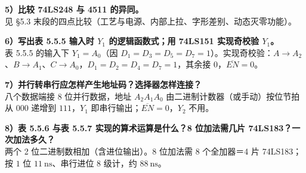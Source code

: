 \documentclass[11pt]{ctexart}
\let\orighdr\hdr
\renewcommand{\hdr}[2]{\needspace{10\baselineskip}\orighdr{#1}{#2}}
\begin{document}
\textbf{5）比较 74LS248 与 4511 的异同。}\\
见 §5.3 末段的四点比较（工艺与电源、内部上拉、字形差别、动态灭零功能）。

\textbf{6）写出表 5.5.5 输入时 $Y_1$ 的逻辑函数式；用 74LS151 实现奇校验 $Y_1$。}\\
表 5.5.5 的输入下 $Y_1=A_0$（因 $D_1=D_3=D_5=D_7=1$）。实现奇校验：$A\to A_2$、$B\to A_1$、$C\to A_0$，$D_1=D_2=D_4=D_7=1$，其余接 0，$\overline{EN}=0$。

\textbf{7）并行转串行应怎样产生地址码？选择器怎样连接？}\\
八个数据端接 8 位并行数据，地址 $A_2A_1A_0$ 由二进制计数器（或手动）按位节拍从 $000$ 递增到 $111$，$Y_1$ 即串行输出；$\overline{EN}=0$，$Y_2$ 不用。

\textbf{8）表 5.5.6 与表 5.5.7 实现的算术运算是什么？8 位加法需几片 74LS183？一次加法多久？}\\
两个 2 位二进制数相加（含进位输出）。8 位加法需 8 个全加器＝4 片 74LS183；按 $1$ 位 $11\ \mathrm{ns}$、串行进位 8 级计，约 $88\ \mathrm{ns}$。


\end{document}

